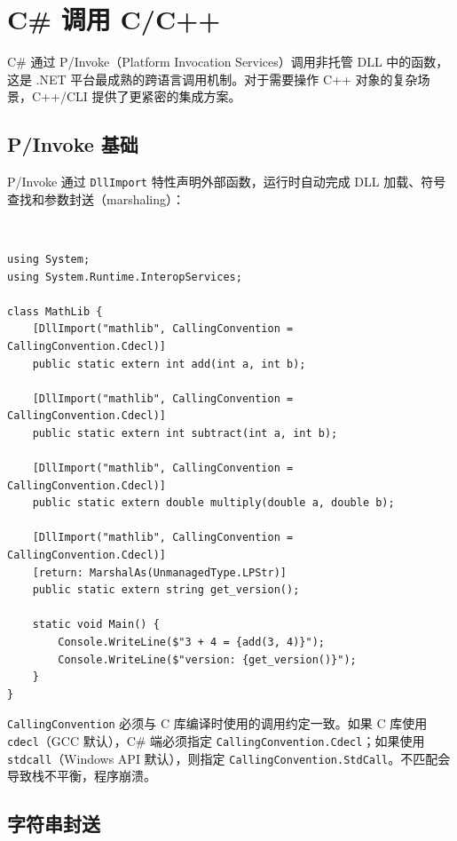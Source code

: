 \documentclass[12pt,a4paper,fontset=fandol]{ctexbook}
\newcommand{\csharplabel}{%
  \begin{tcolorbox}[enhanced,colback=csharpheadbg,colframe=csharpheadbg,
    arc=1mm,boxrule=0mm,left=6pt,right=6pt,top=2pt,bottom=2pt,
    halign=left,oversize]
    \textcolor{white}{\small\bfseries C\#}
  \end{tcolorbox}\vspace{-4pt}}
\newcommand{\cpp}[1]{C++#1}
\newcommand{\Tp}[1]{\texttt{#1}}
\begin{document}
\chapter{C\# 调用 C/C++}

C\# 通过 P/Invoke（Platform Invocation Services）调用非托管 DLL 中的函数，这是 .NET 平台最成熟的跨语言调用机制。对于需要操作 \cpp{} 对象的复杂场景，C++/CLI 提供了更紧密的集成方案。

\section{P/Invoke 基础}

P/Invoke 通过 \Tp{DllImport} 特性声明外部函数，运行时自动完成 DLL 加载、符号查找和参数封送（marshaling）：

\csharplabel
\begin{lstlisting}[style=csharpstyle]
using System;
using System.Runtime.InteropServices;

class MathLib {
    [DllImport("mathlib", CallingConvention = CallingConvention.Cdecl)]
    public static extern int add(int a, int b);

    [DllImport("mathlib", CallingConvention = CallingConvention.Cdecl)]
    public static extern int subtract(int a, int b);

    [DllImport("mathlib", CallingConvention = CallingConvention.Cdecl)]
    public static extern double multiply(double a, double b);

    [DllImport("mathlib", CallingConvention = CallingConvention.Cdecl)]
    [return: MarshalAs(UnmanagedType.LPStr)]
    public static extern string get_version();

    static void Main() {
        Console.WriteLine($"3 + 4 = {add(3, 4)}");
        Console.WriteLine($"version: {get_version()}");
    }
}
\end{lstlisting}

\begin{tcolorbox}[warning={调用约定必须匹配}]
\Tp{CallingConvention} 必须与 C 库编译时使用的调用约定一致。如果 C 库使用 \texttt{cdecl}（GCC 默认），C\# 端必须指定 \texttt{CallingConvention.Cdecl}；如果使用 \texttt{stdcall}（Windows API 默认），则指定 \texttt{CallingConvention.StdCall}。不匹配会导致栈不平衡，程序崩溃。
\end{tcolorbox}

\section{字符串封送}
\end{document}
